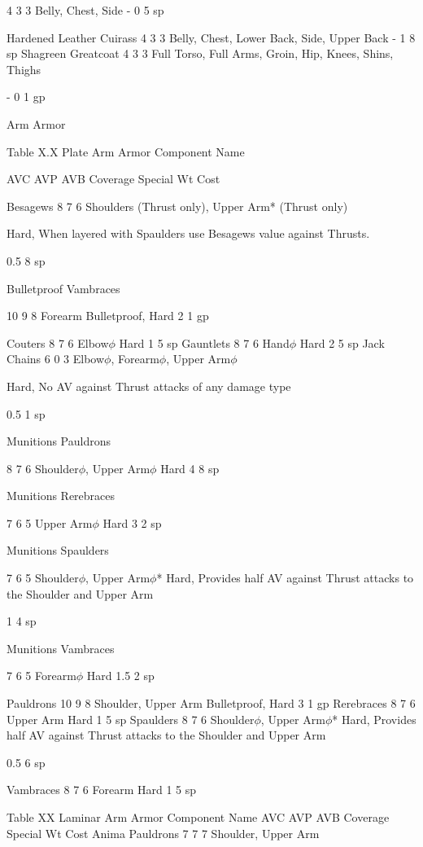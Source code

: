 \documentclass[oneside,11pt,english]{book}
\begin{document}
4 3 3 Belly, Chest, Side - 0 5 sp 

Hardened Leather Cuirass 4 3 3 Belly, Chest, Lower Back, Side, Upper Back - 1 8 sp 
Shagreen Greatcoat 4 3 3 Full Torso, Full Arms, Groin, Hip, Knees, Shins, 
Thighs 

- 0 1 gp 

 

Arm Armor 

 
Table X.X Plate Arm Armor 
Component 
Name 

AVC AVP AVB Coverage Special Wt Cost 

Besagews 8 7 6 Shoulders (Thrust only), 
Upper Arm* (Thrust only) 

Hard, When layered with Spaulders use 
Besagews value against Thrusts. 

0.5 8 sp 

Bulletproof 
Vambraces 

10 9 8 Forearm Bulletproof, Hard 2 1 gp 

Couters 8 7 6 Elbow$\phi$ Hard 1 5 sp 
Gauntlets 8 7 6 Hand$\phi$ Hard 2 5 sp 
Jack Chains 6 0 3 Elbow$\phi$, Forearm$\phi$, Upper 
Arm$\phi$ 

Hard, No AV against Thrust attacks of 
any damage type 

0.5 1 sp 


Munitions 
Pauldrons 

8 7 6 Shoulder$\phi$, Upper Arm$\phi$ Hard 4 8 sp 

Munitions 
Rerebraces 

7 6 5 Upper Arm$\phi$ Hard 3 2 sp 

Munitions 
Spaulders 

7 6 5 Shoulder$\phi$, Upper Arm$\phi$* Hard, Provides half AV against Thrust 
attacks to the Shoulder and Upper Arm 

1 4 sp 

Munitions 
Vambraces 

7 6 5 Forearm$\phi$ Hard 1.5 2 sp 

Pauldrons 10 9 8 Shoulder, Upper Arm Bulletproof, Hard 3 1 gp 
Rerebraces 8 7 6 Upper Arm Hard 1 5 sp 
Spaulders 8 7 6 Shoulder$\phi$, Upper Arm$\phi$* Hard, Provides half AV against Thrust 
attacks to the Shoulder and Upper Arm 

0.5 6 sp 

Vambraces 8 7 6 Forearm Hard 1 5 sp 

 
Table XX Laminar Arm Armor 
Component Name AVC AVP AVB Coverage Special Wt Cost 
Anima Pauldrons 7 7 7 Shoulder, Upper 
Arm 
\end{document}
